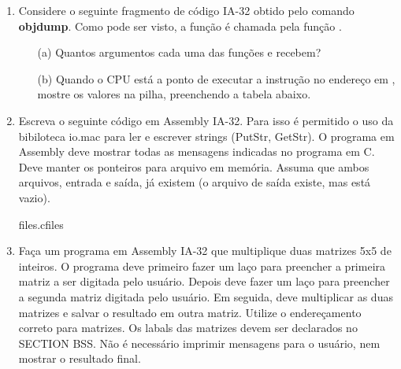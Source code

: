 \begin{enumerate}[resume]

    \item
    Considere o seguinte fragmento de código IA-32 
    obtido pelo comando \textbf{objdump}.
    Como pode ser visto, a função  é chamada pela função .


    \begin{itemize}
        \item [(a)]
        Quantos argumentos cada uma das funções  e  recebem?
        
        \item [(b)]
        Quando o CPU está a ponto de executar a instrução  
        no endereço  em , mostre os valores na pilha, 
        preenchendo a tabela abaixo.
        \begin{figure}[H]\centering
        \end{figure}
    \end{itemize}

    \item
    Escreva o seguinte código em Assembly IA-32.
    Para isso é permitido o uso da bibiloteca io.mac
    para ler e escrever strings (PutStr, GetStr).
    O programa em Assembly deve mostrar 
    todas as mensagens indicadas no programa em C.
    Deve manter os ponteiros para arquivo em memória.
    Assuma que ambos arquivos, entrada e saída, já existem 
    (o arquivo de saída existe, mas está vazio).

         {files.c}{files}

    \item
    Faça um programa em Assembly IA-32
    que multiplique duas matrizes 5x5 de inteiros.
    O programa deve primeiro fazer um laço 
    para preencher a primeira matriz a ser digitada pelo usuário.
    Depois deve fazer um laço 
    para preencher a segunda matriz digitada pelo usuário.
    Em seguida, deve multiplicar as duas matrizes
    e salvar o resultado em outra matriz.
    Utilize o endereçamento correto para matrizes.
    Os labals das matrizes devem ser declarados no SECTION BSS.
    Não é necessário imprimir mensagens para o usuário,
    nem mostrar o resultado final.




\end{enumerate}
